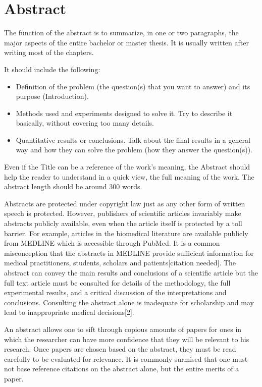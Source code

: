 
\cleardoublepage

\section*{Abstract}

The function of the abstract is to summarize, in one or two paragraphs, the major aspects of the entire bachelor or master thesis. It is usually written after writing most of the chapters.

It should include the following:
\begin{itemize}
	\item Definition of the problem (the question(s) that you want to answer) and its purpose (Introduction).
	\item Methods used and experiments designed to solve it. Try to describe it basically, without covering too many details.
	\item Quantitative results or conclusions. Talk about the final results in a general way and how they can solve the problem (how they answer the question(s)). 
\end{itemize}

Even if the Title can be a reference of the work's meaning, the Abstract should help the reader to understand in a quick view, the full meaning of the work. 
The abstract length should be around 300 words.

Abstracts are protected under copyright law just as any other form of written speech is protected. However, publishers of scientific articles invariably make abstracts publicly available, even when the article itself is protected by a toll barrier. For example, articles in the biomedical literature are available publicly from MEDLINE which is accessible through PubMed. It is a common misconception that the abstracts in MEDLINE provide sufficient information for medical practitioners, students, scholars and patients[citation needed]. The abstract can convey the main results and conclusions of a scientific article but the full text article must be consulted for details of the methodology, the full experimental results, and a critical discussion of the interpretations and conclusions. Consulting the abstract alone is inadequate for scholarship and may lead to inappropriate medical decisions[2].

An abstract\cite{Ikeda1997, levensthein65:_binar, Middleton2002, salton89} allows one to sift through copious amounts of papers for ones in which the researcher can have more confidence that they will be relevant to his research. Once papers are chosen based on the abstract, they must be read carefully to be evaluated for relevance. It is commonly surmised that one must not base reference citations on the abstract alone, but the entire merits of a paper.

\cleardoublepage
